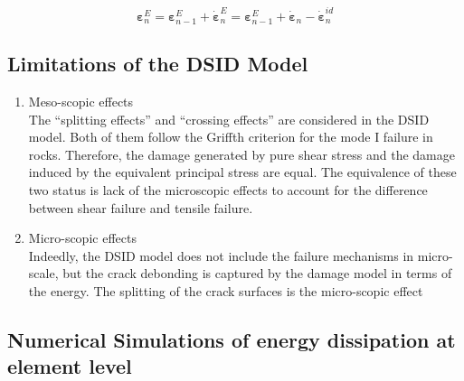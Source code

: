 \documentclass[preprint,review,12pt]{elsarticle}
\begin{document}
\begin{equation}
   \label{eq:energy}
   \bm\varepsilon^E_{n} = \bm\varepsilon^E_{n-1} + \dot{\bm\varepsilon}^E_{n} = \bm\varepsilon^E_{n-1} + \dot{\bm\varepsilon}_{n} - \dot{\bm\varepsilon}^{id}_{n}
\end{equation}
\subsection{Limitations of the DSID Model}
%
\begin{enumerate}
\item Meso-scopic effects
\
\\
The ``splitting effects'' and ``crossing effects'' are considered in the DSID model. Both of them follow the Griffth criterion for the mode I failure in rocks. Therefore, the damage generated by pure shear stress and the damage induced by the equivalent principal stress are equal. The equivalence of these two status is lack of the microscopic effects to account for the difference between shear failure and tensile failure. 
%
\item Micro-scopic effects
\
\\
Indeedly, the DSID model does not include the failure mechanisms in micro-scale, but the crack debonding is captured by the damage model in terms of the energy. The splitting of the crack surfaces is the micro-scopic effect 
\end{enumerate}

\subsection{Numerical Simulations of energy dissipation at element level}
\end{document}
